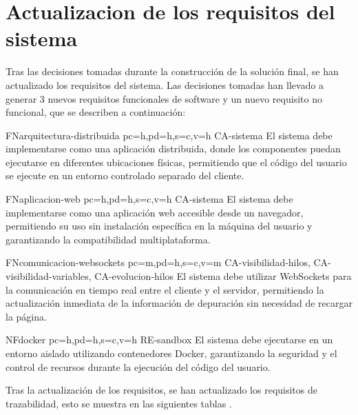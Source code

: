 \section{Actualizacion de los requisitos del sistema} \label{sec:actualizacion-requisitos}
Tras las decisiones tomadas durante la construcción de la solución final, se han actualizado los requisitos del sistema. Las decisiones tomadas han llevado a generar 3 nuevos requisitos funcionales de software y un nuevo requisito no funcional, que se describen a continuación:

\begin{softwareReq}{FN}{arquitectura-distribuida}
    {pc=h,pd=h,s=c,v=h}
    {CA-sistema}
    El sistema debe implementarse como una aplicación distribuida, donde los componentes puedan ejecutarse en diferentes ubicaciones físicas, permitiendo que el código del usuario se ejecute en un entorno controlado separado del cliente.
\end{softwareReq}

\begin{softwareReq}{FN}{aplicacion-web}
    {pc=h,pd=h,s=c,v=h}
    {CA-sistema}
    El sistema debe implementarse como una aplicación web accesible desde un navegador, permitiendo su uso sin instalación específica en la máquina del usuario y garantizando la compatibilidad multiplataforma.
\end{softwareReq}

\begin{softwareReq}{FN}{comunicacion-websockets}
    {pc=m,pd=h,s=c,v=m}
    {CA-visibilidad-hilos, CA-visibilidad-variables, CA-evolucion-hilos}
    El sistema debe utilizar WebSockets para la comunicación en tiempo real entre el cliente y el servidor, permitiendo la actualización inmediata de la información de depuración sin necesidad de recargar la página.
\end{softwareReq}

\begin{softwareReq}{NF}{docker}
    {pc=h,pd=h,s=c,v=h}
    {RE-sandbox}
    El sistema debe ejecutarse en un entorno aislado utilizando contenedores Docker, garantizando la seguridad y el control de recursos durante la ejecución del código del usuario.
\end{softwareReq}

Tras la actualización de los requisitos, se han actualizado los requisitos de trazabilidad, esto se muestra en las siguientes tablas  .


\begin{table}[htb]
      {\traceabilityFNCA}
  \end{table}


